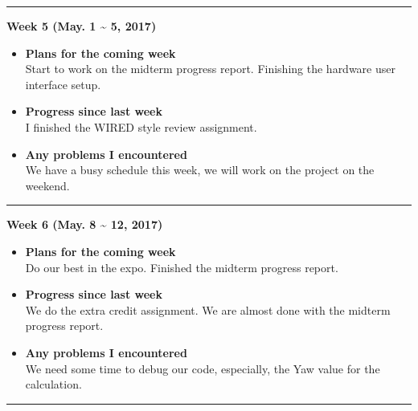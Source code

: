 	\rule{\textwidth}{0.5pt}

	\begin{center}
		\textbf{Week 5 (May. 1 {\textasciitilde{}} 5, 2017)}
	\end{center}
	\begin{itemize}
		\item \textbf{Plans for the coming week}
		\\Start to work on the midterm progress report. Finishing the hardware user interface setup.\\

		\item \textbf{Progress since last week}
		\\I finished the WIRED style review assignment. \\

		\item \textbf{Any problems I encountered}
		\\We have a busy schedule this week, we will work on the project on the weekend.\\
	\end{itemize}

	\rule{\textwidth}{0.5pt}

	\begin{center}
		\textbf{Week 6 (May. 8 {\textasciitilde{}} 12, 2017)}
	\end{center}
	\begin{itemize}
		\item \textbf{Plans for the coming week}
		\\Do our best in the expo. Finished the midterm progress report. \\

		\item \textbf{Progress since last week}
		\\We do the extra credit assignment. We are almost done with the midterm progress report. \\

		\item \textbf{Any problems I encountered}
		\\We need some time to debug our code, especially, the Yaw value for the calculation.\\
	\end{itemize}

	\rule{\textwidth}{0.5pt}

